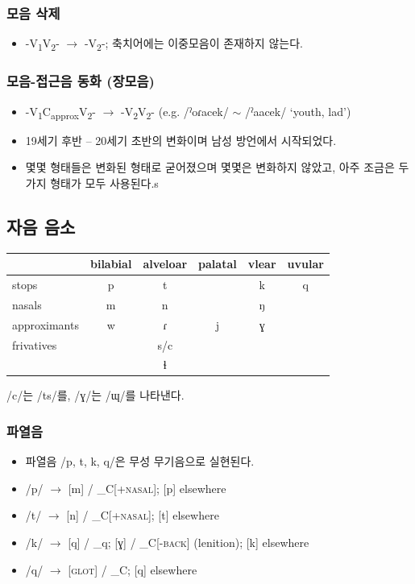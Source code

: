 \subsubsection{모음 삭제}
\begin{itemize}
\item -V\textsubscript{1}V\textsubscript{2}- $\rightarrow$ -V\textsubscript{2}-; 축치어에는 이중모음이 존재하지 않는다.
\end{itemize}

\subsubsection{모음-접근음 동화 (장모음)}
\begin{itemize}
\item -V\textsubscript{1}C\textsubscript{approx}V\textsubscript{2}- $\rightarrow$ -V\textsubscript{2}V\textsubscript{2}- (e.g. /ˀoɾacek/ $\sim$ /ˀaacek/ `youth, lad’)
\item 19세기 후반 -- 20세기 초반의 변화이며 남성 방언에서 시작되었다.
\item 몇몇 형태들은 변화된 형태로 굳어졌으며 몇몇은 변화하지 않았고, 아주 조금은 두 가지 형태가 모두 사용된다.s
\end{itemize}


\subsection{자음 음소}
\begin{center}
\begin{tabular}{|l|ccccc|}\hline
	&bilabial	&alveloar	&palatal	&vlear	&uvular\\\hline
stops	&p	&t	&	&k	&q\\
nasals	&m	&n	&	&ŋ	&\\
approximants	&w	&ɾ	&j	&ɣ	&\\
frivatives	&	&s/c	&	&	&\\
	&	&ɬ	&	&	&\\
\hline
\end{tabular}
\end{center}

\NB\quad /c/는 /ts/를, /ɣ/는 /ɰ/를 나타낸다.

\subsubsection{파열음}
\begin{itemize}
\item 파열음 /p, t, k, q/은 무성 무기음으로 실현된다.
\item /p/ $\rightarrow$ [m] / \_C[+\textsc{nasal}]; [p] elsewhere
\item /t/ $\rightarrow$ [n] / \_C[+\textsc{nasal}]; [t] elsewhere
\item /k/ $\rightarrow$ [q] / \_q; [ɣ] / \_C[-\textsc{back}] (lenition); [k] elsewhere
\item /q/ $\rightarrow$ [\textsc{glot}] / \_C; [q] elsewhere
\end{itemize}

